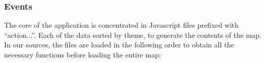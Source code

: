 \subsubsection{Events}



The core of the application is concentrated in Javascript files prefixed with ``action...''. Each of the data sorted by theme, to generate the contents of the map. In our sources, the files are loaded in the following order to obtain all the necessary functions before loading the entire map:

